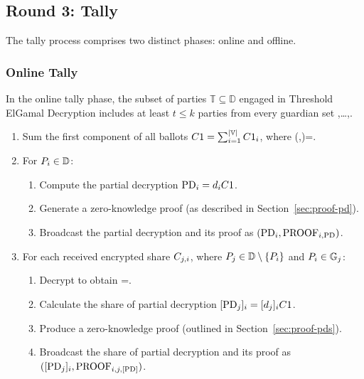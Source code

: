 \documentclass[runningheads]{llncs}
\begin{document}
\subsection{Round 3: Tally}

The tally process comprises two distinct phases: online and offline.

\subsubsection{Online Tally}

In the online tally phase, the subset of parties $\mathbb{T} \subseteq  \mathbb{D}$ engaged in Threshold ElGamal Decryption includes at least $t \leq k$ parties from every guardian set ,\dots,.

\begin{enumerate}
    \item Sum the first component of all ballots $C1 = \sum_{i=1}^{|\mathbb{V}|} C1_{i}$, where (,)=.

    \item For $P_{i} \in \mathbb{D}$:
        \begin{enumerate}
            \item Compute the partial decryption $\mathrm{PD}_{i} = d_{i} C1$.
            \item Generate a zero-knowledge proof  (as described in Section~\ref{sec:proof-pd}).
            \item Broadcast the partial decryption and its proof as $(\mathrm{PD}_{i}, \textrm{PROOF}_{i,\textrm{PD}})$.
        \end{enumerate}
    
    \item For each received encrypted share $C_{j,i}$, where $P_{j} \in \mathbb{D} \setminus \{P_{i}\}$ and $P_{i} \in \mathbb{G}_{j}$:
        \begin{enumerate}
            \item Decrypt to obtain =.
            \item Calculate the share of partial decryption $[\mathrm{PD}_{j}]_{i} = [d_{j}]_{i} C1$.
            \item Produce a zero-knowledge proof  (outlined in Section~\ref{sec:proof-pds}).
            \item Broadcast the share of partial decryption and its proof as $([\mathrm{PD}_{j}]_{i}, \textrm{PROOF}_{i,j,\textrm{[PD]}})$.
        \end{enumerate}
\end{enumerate}
\end{document}
